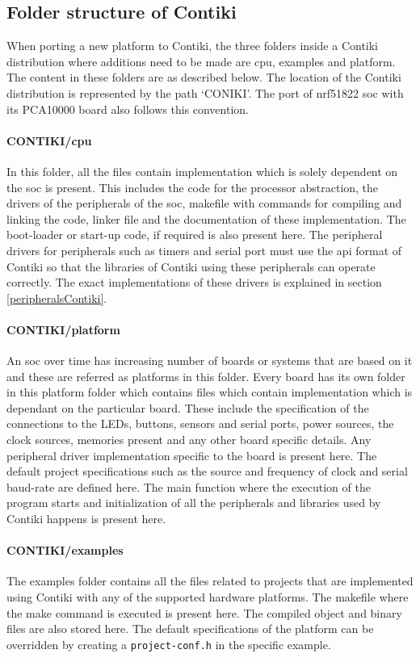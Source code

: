\subsection{Folder structure of Contiki}
When porting a new platform to Contiki, the three folders inside a Contiki distribution where additions need to be made are cpu, examples and platform. The content in these folders are as described below. The location of the Contiki distribution is represented by the path `CONIKI'. The port of nrf51822 \gls{soc} with its PCA10000 board also follows this convention.

\paragraph{CONTIKI/cpu}In this folder, all the files contain implementation which is solely dependent on the \gls{soc} is present. This includes the code for the processor abstraction, the drivers of the peripherals of the \gls{soc}, makefile with commands for compiling and linking the code, linker file and the documentation of these implementation. The boot-loader  or start-up code, if required is also present here. The peripheral drivers for peripherals such as timers and serial port must use the \gls{api} format of Contiki so that the libraries of Contiki using these peripherals can operate correctly. The exact implementations of these drivers is explained in section \ref{peripheralsContiki}. 

\paragraph{CONTIKI/platform} An \gls{soc} over time has increasing number of boards or systems that are based on it and these are referred as platforms in this folder. Every board has its own folder in this platform folder which contains files which contain implementation which is dependant on the particular board. These include the specification of the connections to the LEDs, buttons, sensors and serial ports, power sources, the clock sources, memories present and any other board specific details. Any peripheral driver implementation specific to the board is present here. The default project specifications such as the source and frequency of clock and serial baud-rate are defined here. The main function where the execution of the program starts and initialization of all the peripherals and libraries used by Contiki happens is present here.

\paragraph{CONTIKI/examples} The examples folder contains all the files related to projects that are implemented using Contiki with any of the supported hardware platforms. The makefile where the make command is executed is present here. The compiled object and binary files are also stored here. The default specifications of the platform can be overridden by creating a \texttt{project-conf.h} in the specific example.

